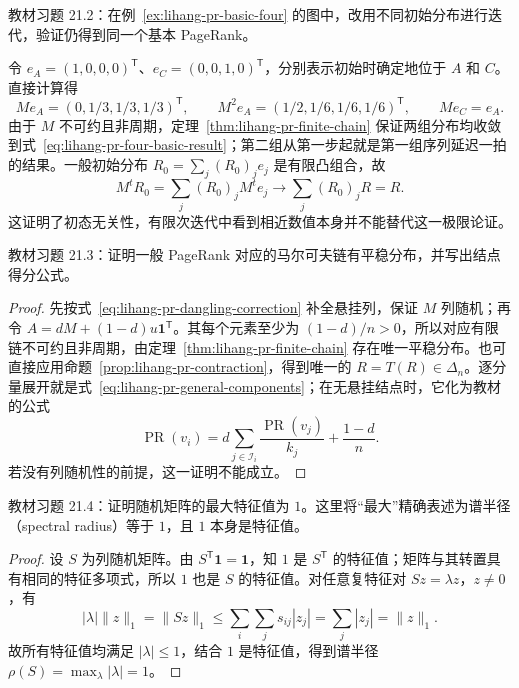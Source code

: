 \begin{example}
\label{ex:lihang-pr-exercise-initialization}
教材习题 21.2：在例~\ref{ex:lihang-pr-basic-four} 的图中，改用不同初始分布进行迭代，验证仍得到同一个基本 PageRank。
\end{example}

\begin{solve}
令 $e_A=(1,0,0,0)^{\mathsf T}$、$e_C=(0,0,1,0)^{\mathsf T}$，分别表示初始时确定地位于 $A$ 和 $C$。直接计算得
\[
    Me_A=(0,1/3,1/3,1/3)^{\mathsf T},\qquad
    M^2e_A=(1/2,1/6,1/6,1/6)^{\mathsf T},\qquad
    Me_C=e_A.
\]
由于 $M$ 不可约且非周期，定理~\ref{thm:lihang-pr-finite-chain} 保证两组分布均收敛到式~\eqref{eq:lihang-pr-four-basic-result}；第二组从第一步起就是第一组序列延迟一拍的结果。一般初始分布 $R_0=\sum_j(R_0)_je_j$ 是有限凸组合，故
\[
    M^tR_0=\sum_j(R_0)_jM^te_j
    \longrightarrow\sum_j(R_0)_jR=R.
\]
这证明了初态无关性，有限次迭代中看到相近数值本身并不能替代这一极限论证。
\end{solve}

\begin{example}
\label{ex:lihang-pr-exercise-general-existence}
教材习题 21.3：证明一般 PageRank 对应的马尔可夫链有平稳分布，并写出结点得分公式。
\end{example}

\begin{proof}
先按式~\eqref{eq:lihang-pr-dangling-correction} 补全悬挂列，保证 $M$ 列随机；再令 $A=dM+(1-d)u\boldsymbol1^{\mathsf T}$。其每个元素至少为 $(1-d)/n>0$，所以对应有限链不可约且非周期，由定理~\ref{thm:lihang-pr-finite-chain} 存在唯一平稳分布。也可直接应用命题~\ref{prop:lihang-pr-contraction}，得到唯一的 $R=T(R)\in\Delta_n$。逐分量展开就是式~\eqref{eq:lihang-pr-general-components}；在无悬挂结点时，它化为教材的公式
\[
    \operatorname{PR}(v_i)
    =d\sum_{j\in\mathcal I_i}\frac{\operatorname{PR}(v_j)}{k_j}
        +\frac{1-d}{n}.
\]
若没有列随机性的前提，这一证明不能成立。
\end{proof}

\begin{example}
\label{ex:lihang-pr-exercise-spectrum}
教材习题 21.4：证明随机矩阵的最大特征值为 $1$。这里将“最大”精确表述为谱半径（spectral radius）等于 $1$，且 $1$ 本身是特征值。
\end{example}

\begin{proof}
设 $S$ 为列随机矩阵。由 $S^{\mathsf T}\boldsymbol1=\boldsymbol1$，知 $1$ 是 $S^{\mathsf T}$ 的特征值；矩阵与其转置具有相同的特征多项式，所以 $1$ 也是 $S$ 的特征值。对任意复特征对 $Sz=\lambda z$，$z\neq0$，有
\[
    |\lambda|\|z\|_1=\|Sz\|_1
    \leq\sum_i\sum_js_{ij}|z_j|
    =\sum_j|z_j|=\|z\|_1.
\]
故所有特征值均满足 $|\lambda|\leq1$，结合 $1$ 是特征值，得到谱半径 $\rho(S)=\max_{\lambda}|\lambda|=1$。
\end{proof}

